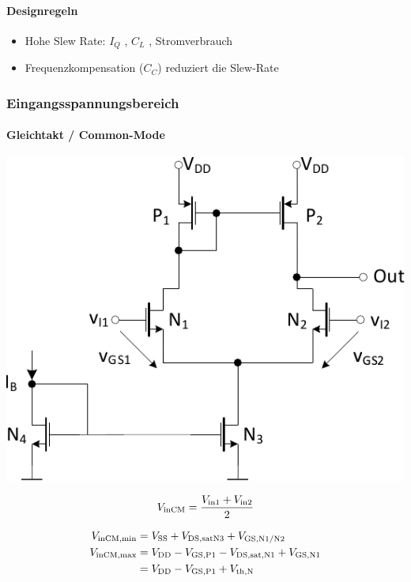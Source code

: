 \paragraph{Designregeln}
\begin{itemize}
    \item Hohe Slew Rate: $I_Q$ \textuparrow, $C_L$ \textdownarrow, Stromverbrauch \textuparrow%
    \item Frequenzkompensation ($C_C$) reduziert die Slew-Rate
\end{itemize}


\subsubsection{Eingangsspannungsbereich}
\paragraph{Gleichtakt / Common-Mode}

\begin{minipage}[t]{0.36\columnwidth}
    \includegraphics[width=\columnwidth, align=t]{images/09_common_mode_range.pdf}
\end{minipage}
\hfill
\begin{minipage}[t]{0.58\columnwidth}
    \[
        V_{\rm inCM} = \frac{V_{\rm in1} + V_{\rm in2}}{2}
    \]
    
    \vspace{-0.5cm}

    \begin{align*}
        V_{\rm inCM, min}   &= V_{\rm SS} + V_{\rm DS,satN3} + V_{\rm GS,N1/N2} \\
        V_{\rm inCM, max}   &= V_{\rm DD} - V_{\rm GS,P1} - V_{\rm DS,sat,N1} + V_{\rm GS,N1} \\
                            &= V_{\rm DD} - V_{\rm GS,P1} + V_{\rm th,N} 
    \end{align*}
\end{minipage}

